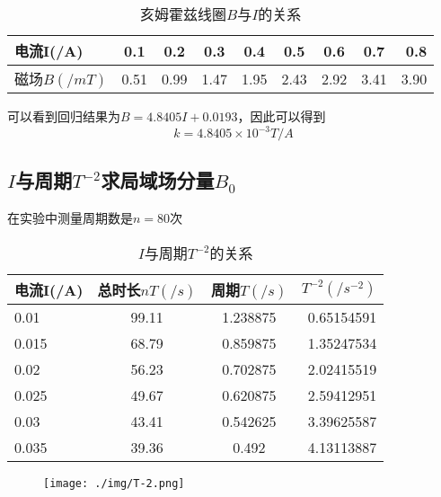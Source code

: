 \documentclass{article}
\begin{document}
\begin{table}[!hbtp]
    \begin{center}
    \caption{亥姆霍兹线圈$B$与$I$的关系}
    \begin{tabular}{l|c|c|c|c|c|c|c|r}
        \textbf{电流I(/A)} & \textbf{0.1} & \textbf{0.2} & \textbf{0.3} & \textbf{0.4} & \textbf{0.5} & \textbf{0.6} & \textbf{0.7} & \textbf{0.8} \\
        \hline
        磁场$B(/mT)$ & 0.51 & 0.99 & 1.47 & 1.95 & 2.43 & 2.92 & 3.41 & 3.90\\
    \end{tabular}
    \end{center}
\end{table}

可以看到回归结果为$B=4.8405I+0.0193$，因此可以得到
\begin{equation}
    k=4.8405\times 10^{-3}T/A
\end{equation}

\subsection{$I$与周期$T^{-2}$求局域场分量$B_0$}
在实验中测量周期数是$n=80$次
\begin{table}[!hbtp]
    \begin{center}
    \caption{$I$与周期$T^{-2}$的关系}
    \begin{tabular}{l|c|c|r}
        \textbf{电流I(/A)} & \textbf{总时长$nT(/s)$} & \textbf{周期$T(/s)$} & \textbf{$T^{-2}(/s^{-2})$} \\
        \hline
        0.01 & 99.11 & 1.238875 & 0.65154591 \\
        \hline
        0.015 & 68.79 & 0.859875 & 1.35247534 \\
        \hline
        0.02 & 56.23 & 0.702875 & 2.02415519 \\
        \hline
        0.025 & 49.67 & 0.620875 & 2.59412951 \\
        \hline
        0.03 & 43.41 & 0.542625 & 3.39625587 \\
        \hline
        0.035 & 39.36 & 0.492 & 4.13113887 \\
    \end{tabular}
    \end{center}
\end{table}

\begin{figure}[H]
    \centering
    \texttt{[image: ./img/T-2.png]}
\end{figure}
\end{document}
